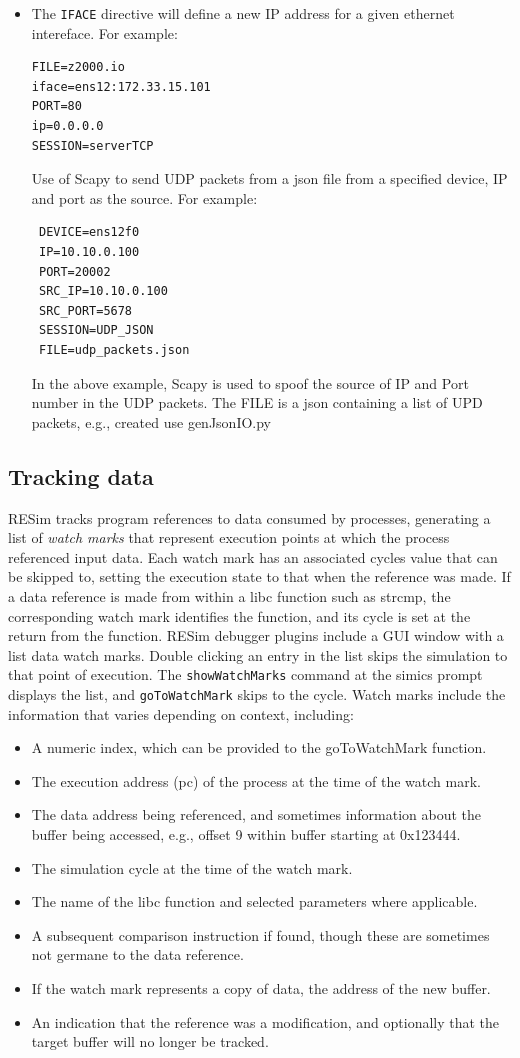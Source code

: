 \documentclass[titlepage]{article}
\begin{document}
\begin{itemize}
\item The {\tt IFACE} directive will define a new IP address for a given ethernet intereface.  For example:
\begin{verbatim}
FILE=z2000.io
iface=ens12:172.33.15.101
PORT=80
ip=0.0.0.0
SESSION=serverTCP
\end{verbatim}

Use of Scapy to send UDP packets from a json file from a specified device, IP and port as the source.  For example:
\begin{verbatim}
 DEVICE=ens12f0
 IP=10.10.0.100
 PORT=20002
 SRC_IP=10.10.0.100
 SRC_PORT=5678
 SESSION=UDP_JSON
 FILE=udp_packets.json 
\end{verbatim}
In the above example, Scapy is used to spoof the source of IP and Port number in the UDP packets.  The FILE is a json containing a list of UPD packets,
e.g., created use genJsonIO.py

\end{itemize}


\subsection{Tracking data}
\label{tracking}
RESim tracks program references to data consumed by processes, generating a list of \textit{watch marks} that represent
execution points at which the process referenced input data.  Each watch mark has an associated cycles value that can be skipped to, setting the
execution state to that when the reference was made.  If a data reference is made from within a libc function such as strcmp, the corresponding 
watch mark identifies the function, and its cycle is set at the return from the function.  RESim debugger plugins include a GUI window with a list data watch marks.
Double clicking an entry in the list skips the simulation to that point of execution.  The {\tt showWatchMarks} command at the simics prompt displays the list,
and {\tt goToWatchMark} skips to the cycle.  Watch marks include the information that varies depending on context, including:
\begin{itemize}
\item A numeric index, which can be provided to the goToWatchMark function.
\item The execution address (pc) of the process at the time of the watch mark.
\item The data address being referenced, and sometimes information about the buffer being accessed, e.g., offset 9 within buffer starting at 0x123444.
\item The simulation cycle at the time of the watch mark.
\item The name of the libc function and selected parameters where applicable.
\item A subsequent comparison instruction if found, though these are sometimes not germane to the data reference.
\item If the watch mark represents a copy of data, the address of the new buffer.
\item An indication that the reference was a modification, and optionally that the target buffer will no longer be tracked.
\end{itemize}
\end{document}
